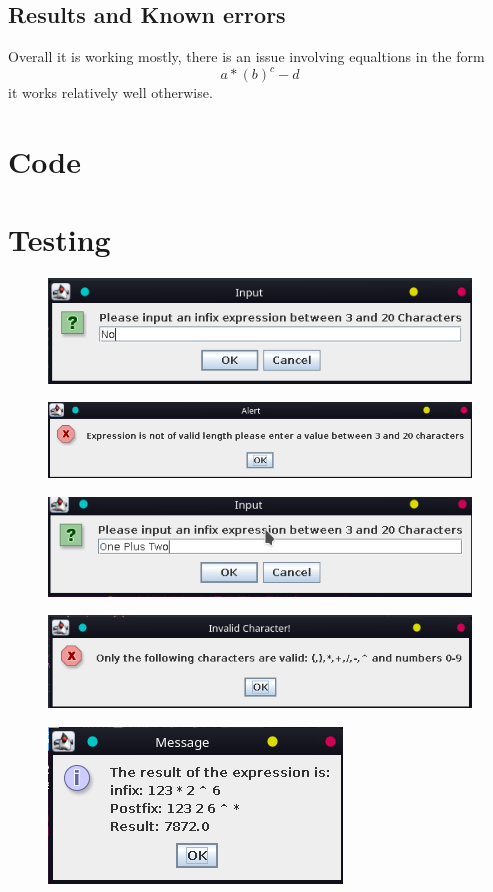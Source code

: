 \documentclass{article}
\begin{document}
	\subsection{Results and Known errors}
	Overall it is working mostly, there is an issue involving equaltions in the form $$a*(b)^{c}-d$$ it works relatively well otherwise.

	\section{Code}
	\section{Testing}
		\begin{figure}[h!]
			\centering
			\includegraphics{1.png}
		\end{figure}
		\begin{figure}[h!]
		\centering
		\includegraphics{2.png}
		\end{figure}
		\begin{figure}[h!]
			\centering
			\includegraphics{3.png}
		\end{figure}
		\begin{figure}[h!]
			\centering
			\includegraphics{5.png}
		\end{figure}
		\begin{figure}[h!]
			\centering
			\includegraphics{4.png}
		\end{figure}

	
	
\end{document}
